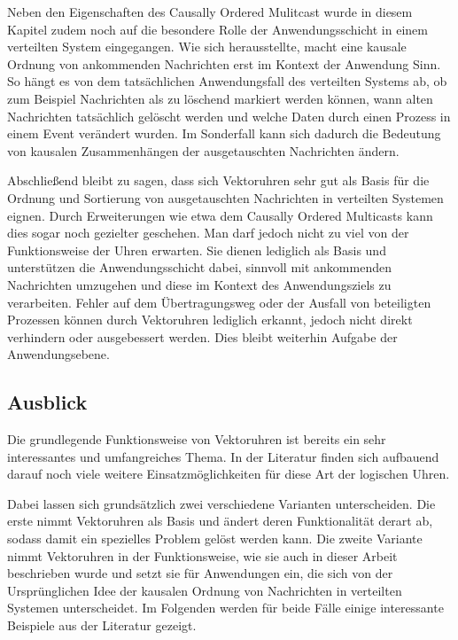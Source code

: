 Neben den Eigenschaften des Causally Ordered Mulitcast wurde in diesem Kapitel zudem noch auf die besondere Rolle der Anwendungsschicht in einem verteilten System eingegangen. Wie sich herausstellte, macht eine kausale Ordnung von ankommenden Nachrichten erst im Kontext der Anwendung Sinn. So hängt es von dem tatsächlichen Anwendungsfall des verteilten Systems ab, ob zum Beispiel Nachrichten als zu löschend markiert werden können, wann alten Nachrichten tatsächlich gelöscht werden und welche Daten durch einen Prozess in einem Event verändert wurden. Im Sonderfall kann sich dadurch die Bedeutung von kausalen Zusammenhängen der ausgetauschten Nachrichten ändern.

Abschließend bleibt zu sagen, dass sich Vektoruhren sehr gut als Basis für die Ordnung und Sortierung von ausgetauschten Nachrichten in verteilten Systemen eignen. Durch Erweiterungen wie etwa dem Causally Ordered Multicasts kann dies sogar noch gezielter geschehen. Man darf jedoch nicht zu viel von der Funktionsweise der Uhren erwarten. Sie dienen lediglich als Basis und unterstützen die Anwendungsschicht dabei, sinnvoll mit ankommenden Nachrichten umzugehen und diese im Kontext des Anwendungsziels zu verarbeiten. Fehler auf dem Übertragungsweg oder der Ausfall von beteiligten Prozessen können durch Vektoruhren lediglich erkannt, jedoch nicht direkt verhindern oder ausgebessert werden. Dies bleibt weiterhin Aufgabe der Anwendungsebene.
\subsection{Ausblick}
Die grundlegende Funktionsweise von Vektoruhren ist bereits ein sehr interessantes und umfangreiches Thema. In der Literatur finden sich aufbauend darauf noch viele weitere Einsatzmöglichkeiten für diese Art der logischen Uhren.

Dabei lassen sich grundsätzlich zwei verschiedene Varianten unterscheiden. Die erste nimmt Vektoruhren als Basis und ändert deren Funktionalität derart ab, sodass damit ein spezielles Problem gelöst werden kann. Die zweite Variante nimmt Vektoruhren in der Funktionsweise, wie sie auch in dieser Arbeit beschrieben wurde und setzt sie für Anwendungen ein, die sich von der Ursprünglichen Idee der kausalen Ordnung von Nachrichten in verteilten Systemen unterscheidet. Im Folgenden werden für beide Fälle einige interessante Beispiele aus der Literatur gezeigt.

